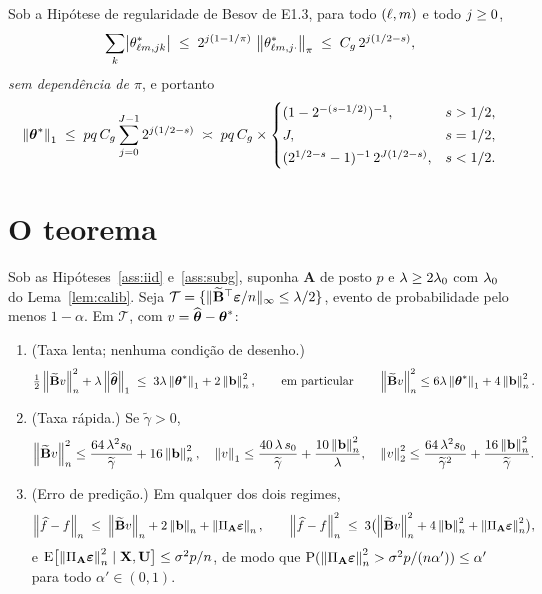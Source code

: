 \documentclass[11pt,a4paper]{article}
\newcommand{\Amat}{\mathbf{A}}
\newcommand{\Bmat}{\mathbf{B}}
\newcommand{\Btil}{\widetilde{\Bmat}}
\newcommand{\PA}{\Pi_{\Amat}}
\newcommand{\bveps}{\boldsymbol{\varepsilon}}
\newcommand{\bb}{\mathbf{b}}
\newcommand{\gtil}{\widetilde{\gamma}}
\begin{document}
\begin{lemma}\label{lem:l1besov}
Sob a Hipótese de regularidade de Besov de E1.3, para todo $(\ell,m)$ e todo
$j \ge 0$,
\[
  \sum_{k}\bigl|\theta^{*}_{\ell m,jk}\bigr|
  \;\le\; 2^{j(1 - 1/\pi)}\,\left\lVert \theta^{*}_{\ell m,j\cdot} \right\rVert_{\pi}
  \;\le\; C_{g}\,2^{j(1/2 - s)},
\]
\emph{sem dependência de $\pi$}, e portanto
\[
  \left\lVert \boldsymbol{\theta}^{*} \right\rVert_{1}
  \;\le\; pq\,C_{g}\sum_{j=0}^{J-1}2^{j(1/2-s)}
  \;\asymp\; pq\,C_{g}\times
  \begin{cases}
    (1 - 2^{-(s-1/2)})^{-1}, & s > 1/2,\\[2pt]
    J, & s = 1/2,\\[2pt]
    (2^{1/2-s}-1)^{-1}\,2^{J(1/2-s)}, & s < 1/2 .
  \end{cases}
\]
\end{lemma}

\section{O teorema}

\begin{theorem}\label{thm:oraculo}
Sob as Hipóteses~\ref{ass:iid} e~\ref{ass:subg}, suponha $\Amat$ de posto $p$
e $\lambda \ge 2\lambda_{0}$ com $\lambda_{0}$ do Lema~\ref{lem:calib}. Seja
$\mathcal{T} = \{\lVert\Btil\T\bveps/n\rVert_{\infty} \le \pen/2\}$, evento de
probabilidade pelo menos $1 - \alpha$. Em $\mathcal{T}$, com
$v = \widehat{\boldsymbol{\theta}} - \boldsymbol{\theta}^{*}$:
\begin{enumerate}[label=\textup{(\roman*)}, leftmargin=*]
  \item \textup{(Taxa lenta; nenhuma condição de desenho.)}
    \[
      \tfrac12\normn{\Btil v}^{2} + \pen\norm{\thetahat}_{1}
      \;\le\; 3\pen\norm{\thetastar}_{1} + 2\normn{\bb}^{2},
      \qquad\text{em particular}\qquad
      \normn{\Btil v}^{2} \le 6\pen\norm{\thetastar}_{1} + 4\normn{\bb}^{2}.
    \]
  \item \textup{(Taxa rápida.)} Se $\gtil > 0$,
    \[
      \normn{\Btil v}^{2} \le \frac{64\,\pen^{2}s_{0}}{\gtil} + 16\normn{\bb}^{2},
      \quad
      \norm{v}_{1} \le \frac{40\,\pen\,s_{0}}{\gtil} + \frac{10\normn{\bb}^{2}}{\pen},
      \quad
      \norm{v}_{2}^{2} \le \frac{64\,\pen^{2}s_{0}}{\gtil^{2}}
      + \frac{16\normn{\bb}^{2}}{\gtil}.
    \]
  \item \textup{(Erro de predição.)} Em qualquer dos dois regimes,
    \[
      \normn{\widehat{f} - f} \;\le\; \normn{\Btil v} + 2\normn{\bb} + \normn{\PA\bveps},
      \qquad
      \normn{\widehat{f} - f}^{2} \;\le\; 3\bigl(\normn{\Btil v}^{2}
      + 4\normn{\bb}^{2} + \normn{\PA\bveps}^{2}\bigr),
    \]
    e $\E\bigl[\normn{\PA\bveps}^{2} \mid \bX, \bU\bigr] \le \sigma^{2}p/n$, de
    modo que $\Prob(\normn{\PA\bveps}^{2} > \sigma^{2}p/(n\alpha')) \le \alpha'$
    para todo $\alpha' \in (0,1)$.
\end{enumerate}
\end{theorem}
\end{document}
